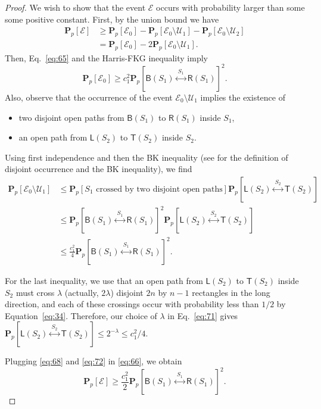 \documentclass[12pt, twoside,a4paper,reqno]{amsart}
\theoremstyle{plain}
\theoremstyle{remark}
\theoremstyle{definition}
\newcommand{\PP}{\mathbf{P}}
\newcommand{\Pp}[1]{\PP_p \left [ #1 \right ]}
\newcommand{\lr}[1][]{\overset{\:#1\:}\longleftrightarrow}
\begin{document}
\begin{proof}
We wish to show that the event $\mathcal E$ occurs with probability larger than
some some positive constant. First, by the union bound we have
\begin{align}
  \Pp{\mathcal E}&\ge \Pp{\mathcal E_0} - \Pp{\mathcal E_0\setminus \mathcal
    U_1}-\Pp{\mathcal E_0\setminus \mathcal U_2}\\
&= \Pp{\mathcal E_0} -2 \Pp{\mathcal E_0\setminus \mathcal
    U_1}.\label{eq:66}
\end{align}
Then,  Eq.~\eqref{eq:65} and the Harris-FKG inequality imply
\begin{equation}
  \label{eq:68}
  \Pp{\mathcal E_0}\ge c_1^2 \Pp{\mathsf B(S_1)\lr[S_1] \mathsf R(S_1)}^2.
\end{equation}
Also, observe that the occurrence of the event $\mathcal E_0\setminus \mathcal
U_1$ implies the existence of
\begin{itemize}
\item two disjoint open paths from $\mathsf B(S_1)$ to $\mathsf R(S_1)$
  inside $S_1$,
\item an open path from $\mathsf L(S_2)$ to $\mathsf T(S_2)$ inside $S_2$.
\end{itemize}

Using first independence and then the BK inequality (see \cite{grimmett1999} for the
definition of disjoint occurrence and the BK inequality), we find 
\begin{align}
  \Pp{\mathcal E_0\setminus \mathcal U_1}&\le \Pp{\text{$S_1$ crossed by two
      disjoint open paths}} \Pp{\mathsf
    L(S_2)\lr[S_2] \mathsf T(S_2)}\\
  &\le \Pp{\mathsf B(S_1)\lr[S_1]\mathsf R(S_1)}^2 \Pp{\mathsf L(S_2)\lr[S_2]
    \mathsf T(S_2)}\\
  &\le \frac{c_1^2}4 \Pp{\mathsf B(S_1)\lr[S_1]\mathsf R(S_1)}^2.\label{eq:72}
\end{align}

For the last inequality, we use that an open path from $\mathsf L(S_2)$ to
$\mathsf T(S_2)$ inside $S_2$ must cross $\lambda$ (actually, $2 \lambda$)
disjoint $2n$ by $n-1$ rectangles in the long direction, and each of these
crossings occur with probability less than $1/2$ by Equation~\eqref{eq:34}.
Therefore, our choice of $\lambda$ in Eq.~\eqref{eq:71} gives $\Pp{\mathsf
  L(S_2)\lr[S_2] \mathsf T(S_2)}\le 2^{-\lambda}\le c_1^2/4$.

Plugging \eqref{eq:68} and \eqref{eq:72} in \eqref{eq:66}, we obtain
\begin{equation}
  \label{eq:67}
  \Pp{\mathcal E}\ge \frac{c_1^2}2\Pp{\mathsf B(S_1)\lr[S_1]\mathsf R(S_1)}^2.
\end{equation}


\end{proof}
\end{document}
